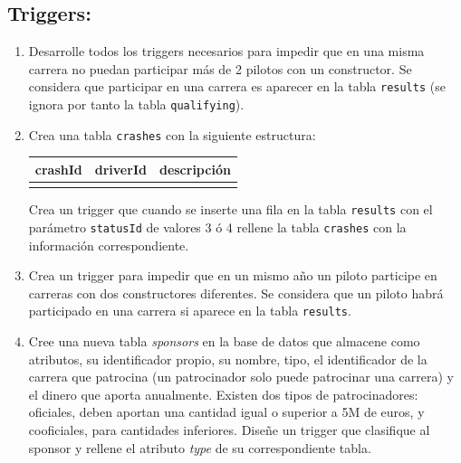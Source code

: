 \documentclass{db-practice}
\begin{document}
\subsection*{Triggers:}

\begin{enumerate}
    
    \item Desarrolle todos los triggers necesarios para impedir que en una misma carrera no puedan participar más de 2 pilotos con un constructor. Se considera que participar en una carrera es aparecer en la tabla \texttt{results} (se ignora por tanto la tabla \texttt{qualifying}).
        
    \item Crea una tabla \texttt{crashes} con la siguiente estructura:
    \begin{table}[H]
    \centering
    \begin{tabular}{@{}lll@{}}
    \toprule
    \multicolumn{1}{c}{\textbf{crashId}} & \multicolumn{1}{c}{\textbf{driverId}} & \multicolumn{1}{c}{\textbf{descripción}} \\ \midrule
                                         &                                       &                                          \\ \bottomrule
    \end{tabular}
    \end{table}

    Crea un trigger que cuando se inserte una fila en la tabla \texttt{results} con el parámetro \texttt{statusId} de valores 3 ó 4 rellene la tabla \texttt{crashes} con la información correspondiente.

    \item Crea un trigger para impedir que en un mismo año un piloto participe en carreras con dos constructores diferentes. Se considera que un piloto habrá participado en una carrera si aparece en la tabla \texttt{results}.
    
    \item Cree una nueva tabla \textit{sponsors} en la base de datos que almacene como atributos, su identificador propio, su nombre, tipo, el identificador de la carrera que patrocina (un patrocinador solo puede patrocinar una carrera) y el dinero que aporta anualmente. Existen dos tipos de patrocinadores: oficiales, deben aportan una cantidad igual o superior a 5M de euros, y cooficiales, para cantidades inferiores. Diseñe un trigger que clasifique al sponsor y rellene el atributo \textit{type} de su correspondiente tabla.
    

\end{enumerate}
\end{document}
